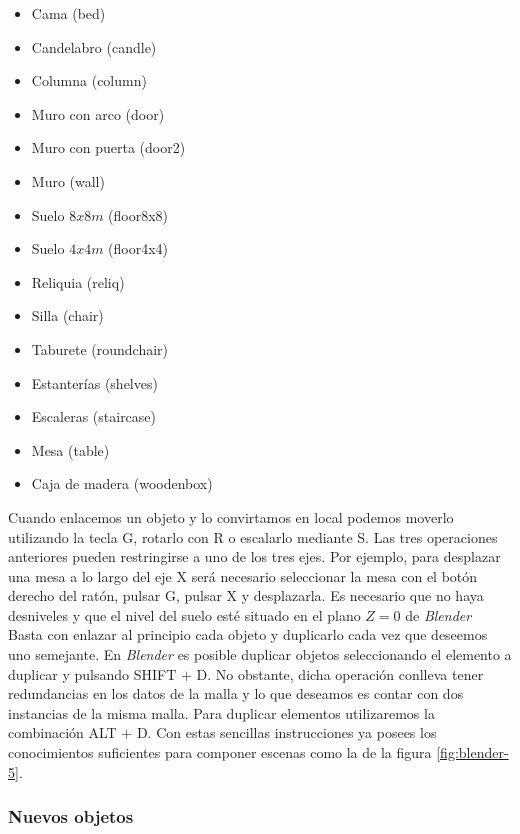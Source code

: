 \documentclass[a4paper,11pt]{article}
\begin{document}
\begin{itemize}
    \itemsep0em
    \item Cama (bed)
    \item Candelabro (candle)
    \item Columna (column)
    \item Muro con arco (door)
    \item Muro con puerta (door2)
    \item Muro (wall)
    \item Suelo $8x8 m$ (floor8x8)
    \item Suelo $4x4 m$ (floor4x4)
    \item Reliquia (reliq)
    \item Silla (chair)
    \item Taburete (roundchair)
    \item Estanterías (shelves)
    \item Escaleras (staircase)
    \item Mesa (table)
    \item Caja de madera (woodenbox)
\end{itemize}

Cuando enlacemos un objeto y lo convirtamos en local podemos moverlo utilizando
la tecla G, rotarlo con R o escalarlo mediante S. Las tres operaciones anteriores
pueden restringirse a uno de los tres ejes. Por ejemplo, para desplazar
una mesa a lo largo del eje X será necesario seleccionar la mesa con el botón
derecho del ratón, pulsar G, pulsar X y desplazarla. Es necesario que
no haya desniveles y que el nivel del suelo esté situado en el plano $Z = 0$
de \textit{Blender}\\

Basta con enlazar al principio cada objeto y duplicarlo cada vez que deseemos
uno semejante. En \textit{Blender} es posible duplicar objetos seleccionando
el elemento a duplicar y pulsando SHIFT $+$ D. No obstante, dicha operación
conlleva tener redundancias en los datos de la malla y lo que deseamos es
contar con dos instancias de la misma malla. Para duplicar elementos
utilizaremos la combinación ALT $+$ D. Con estas sencillas instrucciones
ya posees los conocimientos suficientes para componer escenas como la de
la figura \ref{fig:blender-5}.


\subsubsection{Nuevos objetos}
\end{document}
